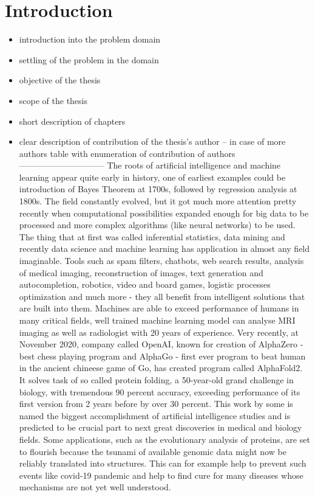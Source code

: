 \documentclass[a4paper,twoside,12pt]{book}
\begin{document}


\chapter{Introduction}

\begin{itemize}
\item introduction into the problem domain
\item settling of the problem in the domain
\item objective of the thesis
\item scope of the thesis
\item short description of chapters
\item clear description of contribution of the thesis's author – in case of more authors table with enumeration of contribution of authors
\newline
------------------------------
\newline
The roots of artificial intelligence and machine learning appear quite early in history, one of earliest examples could be introduction of Bayes Theorem at 1700s, followed by regression analysis at 1800s. The field constantly evolved, but it got much more attention pretty recently when computational possibilities expanded enough for big data to be processed and more complex algorithms (like neural networks) to be used.
The thing that at first was called inferential statistics, data mining and recently data science and machine learning has application in almost any field imaginable. Tools such as spam filters, chatbots, web search results, analysis of medical imaging, reconstruction of images, text generation and autocompletion, robotics, video and board games, logistic processes optimization and much more - they all benefit from intelligent solutions that are built into them.
Machines are able to exceed performance of humans in many critical fields, well trained machine learning model can analyse MRI imaging as well as radiologist with 20 years of experience. Very recently, at November 2020, company called OpenAI, known for creation of AlphaZero - best chess playing program and AlphaGo - first ever program to beat human in the ancient chineese game of Go, has created program called AlphaFold2. It solves task of so called protein folding, a 50-year-old grand challenge in biology, with tremendous 90 percent accuracy, exceeding performance of its first version from 2 years before by over 30 percent. This work by some is named the biggest accomplishment of artificial intelligence studies and is predicted to be crucial part to next great discoveries in medical and biology fields. Some applications, such as the evolutionary analysis of proteins, are set to flourish because the tsunami of available genomic data might now be reliably translated into structures. This can for example help to prevent such events like covid-19 pandemic and help to find cure for many diseases whose mechanisms are not yet well understood.

\end{itemize}
\end{document}
